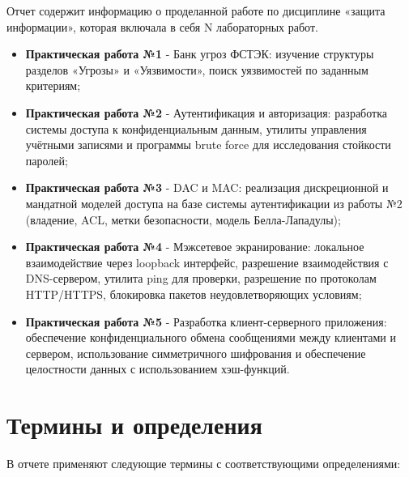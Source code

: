 \documentclass[areasetadvanced]{scrartcl}
\begin{document}
Отчет содержит информацию о проделанной работе по дисциплине «защита информации», которая включала в себя N лабораторных работ.

\begin{itemize}
    \item \textbf{Практическая работа №1} - Банк угроз ФСТЭК: изучение структуры разделов «Угрозы» и «Уязвимости», поиск уязвимостей по заданным критериям;
    \item \textbf{Практическая работа №2} - Аутентификация и авторизация: разработка системы доступа к конфиденциальным данным, утилиты управления учётными записями и программы brute force для исследования стойкости паролей;
    \item \textbf{Практическая работа №3} - DAC и MAC: реализация дискреционной и мандатной моделей доступа на базе системы аутентификации из работы №2 (владение, ACL, метки безопасности, модель Белла-Лападулы);
    \item \textbf{Практическая работа №4} - Мэжсетевое экранирование: локальное взаимодействие через loopback интерфейс, разрешение взаимодействия с DNS-сервером, утилита ping для проверки, разрешение по протоколам HTTP/HTTPS, блокировка пакетов неудовлетворяющих условиям;
    \item \textbf{Практическая работа №5} - Разработка клиент-серверного приложения: обеспечение конфиденциального обмена сообщениями между клиентами и сервером, использование симметричного шифрования и обеспечение целостности данных с использованием хэш-функций.
\end{itemize}

\newpage

\section*{Термины и определения}

В отчете применяют следующие термины с соответствующими определениями:
\end{document}
